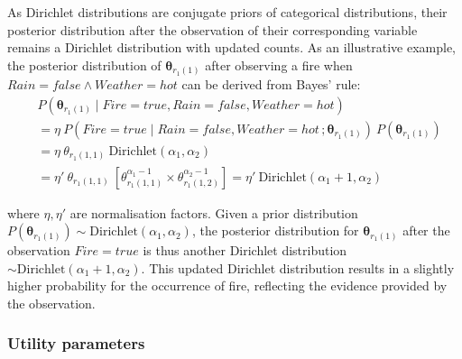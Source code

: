 As Dirichlet distributions are conjugate priors of categorical distributions, their posterior distribution after the observation of their corresponding variable remains a Dirichlet distribution with updated counts. As an illustrative example, the posterior distribution of $\boldsymbol\theta_{r_{1}(1)}$ after observing a fire when $\mathit{Rain}\!=\!\mathit{false} \land \mathit{Weather}\!=\!\mathit{hot}$ can be derived from Bayes' rule: 
\begin{align}
&P(\boldsymbol\theta_{r_{1}(1)} \; | \; \mathit{Fire}\!=\!\mathit{true}, \mathit{Rain}\!=\!\mathit{false}, \mathit{Weather}\!=\!\mathit{hot}) \nonumber \\
& = \eta \ P(\mathit{Fire}\!=\!\mathit{true} \; | \; \mathit{Rain}\!=\!\mathit{false}, \mathit{Weather}\!=\!\mathit{hot}\,; \boldsymbol\theta_{r_{1}(1)}) \ P(\boldsymbol\theta_{r_{1}(1)}) \nonumber \\
& = \eta \ \theta_{r_{1}(1,1)} \ \mathrm{Dirichlet}(\alpha_1,\alpha_2) \nonumber \\
& = \eta' \ \theta_{r_{1}(1,1)} \ [ \theta_{r_{1}(1,1)}^{\alpha_1 - 1} \times \theta_{r_{1}(1,2)}^{\alpha_2 - 1} ]   = \eta' \ \textrm{Dirichlet}(\alpha_1+1,\alpha_2) \nonumber 
\end{align}

where $\eta, \eta'$ are normalisation factors.  Given a prior distribution $P(\boldsymbol\theta_{r_{1}(1)}) \sim \mathrm{Dirichlet}(\alpha_1, \alpha_2)$, the posterior distribution for $\boldsymbol\theta_{r_{1}(1)}$ after the observation  $\mathit{Fire}\!=\!\mathit{true}$ is thus another Dirichlet distribution $\sim \mathrm{Dirichlet}(\alpha_1+1,\alpha_2)$.  This updated Dirichlet distribution results in a slightly higher probability for the occurrence of fire, reflecting the evidence provided by the observation. 




\subsubsection*{Utility parameters}

